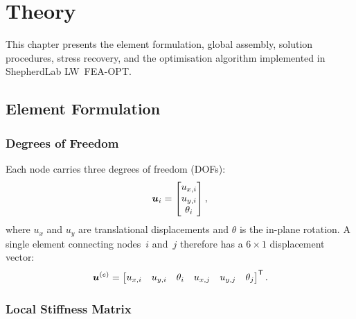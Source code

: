 \chapter{Theory}
\label{ch:theory}

This chapter presents the element formulation, global assembly, solution
procedures, stress recovery, and the optimisation algorithm implemented in
ShepherdLab LW~FEA-OPT.

\section{Element Formulation}
\label{sec:element}

\subsection{Degrees of Freedom}

Each node carries three degrees of freedom (DOFs):
%
\begin{equation}
    \bm{u}_i = \begin{bmatrix} u_{x,i} \\ u_{y,i} \\ \theta_i \end{bmatrix},
\end{equation}
%
where $u_x$ and $u_y$ are translational displacements and $\theta$ is the
in-plane rotation.  A single element connecting nodes~$i$ and~$j$ therefore
has a $6\times1$ displacement vector:
%
\begin{equation}
    \bm{u}^{(e)} =
    \begin{bmatrix} u_{x,i} & u_{y,i} & \theta_i & u_{x,j} & u_{y,j} & \theta_j \end{bmatrix}^{\mathsf{T}}.
\end{equation}

\subsection{Local Stiffness Matrix}

